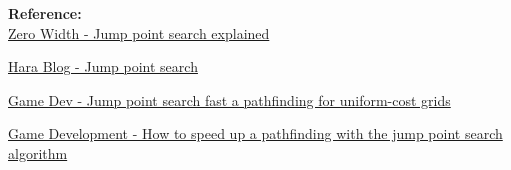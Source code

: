 \textbf{Reference:} \\
\href{https://zerowidth.com/2013/05/05/jump-point-search-explained.html}{Zero Width - Jump point search explained}

\href{https://harablog.wordpress.com/2011/09/07/jump-point-search/}{Hara Blog - Jump point search}

\href{https://www.gamedev.net/articles/programming/artificial-intelligence/jump-point-search-fast-a-pathfinding-for-uniform-cost-grids-r4220/}{Game Dev - Jump point search fast a pathfinding for uniform-cost grids}

\href{https://gamedevelopment.tutsplus.com/tutorials/how-to-speed-up-a-pathfinding-with-the-jump-point-search-algorithm--gamedev-5818}{Game Development - How to speed up a pathfinding with the jump point search algorithm}






